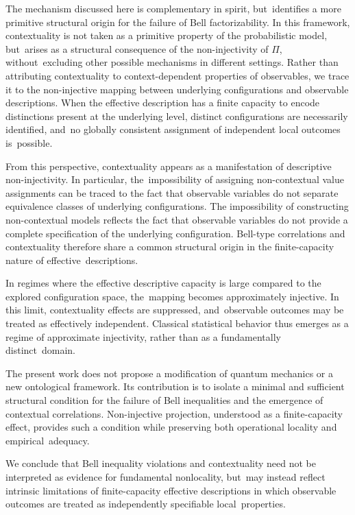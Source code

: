 \documentclass[quantumrep,article,accept,pdftex,oneauthor]{Definitions/mdpi}
\theoremstyle{remark}
\begin{document}
    The mechanism discussed here is complementary in spirit, but~identifies a more
    primitive structural origin for the failure of Bell factorizability.
    In this framework, contextuality is not taken as a primitive property of the
    probabilistic model, but~arises as a structural consequence of the non-injectivity
    of $\Pi$, without~excluding other possible mechanisms in different settings.
    Rather than attributing contextuality to context-dependent properties of observables,
    we trace it to the non-injective mapping between underlying configurations and
    observable descriptions.
    When the effective description has a finite capacity to encode distinctions present
    at the underlying level, distinct configurations are necessarily identified, and~no
    globally consistent assignment of independent local outcomes is~possible.

    From this perspective, contextuality appears as a manifestation of descriptive
    non-injectivity.
    In particular, the~impossibility of assigning non-contextual value assignments
    can be traced to the fact that observable variables do not separate equivalence classes
    of underlying configurations.
    The impossibility of constructing non-contextual models reflects the fact that
    observable variables do not provide a complete specification of the underlying
    configuration.
    Bell-type correlations and contextuality therefore share a common structural origin
    in the finite-capacity nature of effective~descriptions.

    In regimes where the effective descriptive capacity is large compared to the
    explored configuration space, the~mapping becomes approximately injective.
    In this limit, contextuality effects are suppressed, and~observable outcomes may be
    treated as effectively independent.
    Classical statistical behavior thus emerges as a regime of approximate injectivity,
    rather than as a fundamentally distinct~domain.

    The present work does not propose a modification of quantum mechanics or a new
    ontological framework.
    Its contribution is to isolate a minimal and sufficient structural condition for the
    failure of Bell inequalities and the emergence of contextual correlations.
    Non-injective projection, understood as a finite-capacity effect, provides such a
    condition while preserving both operational locality and empirical~adequacy.

    We conclude that Bell inequality violations and contextuality need not be interpreted
    as evidence for fundamental nonlocality, but~may instead reflect intrinsic limitations
    of finite-capacity effective descriptions in which observable outcomes are treated as
    independently specifiable local~properties.
\end{document}
